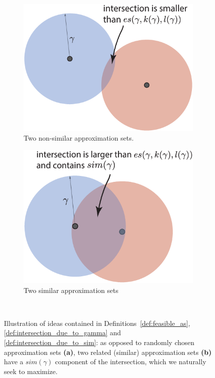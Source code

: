 \begin{figure}[t!]
  \centering
  \begin{subfigure}[b]{.49\textwidth}
      \label{fig:intersection_due_to_gamma} 
      \includegraphics[width=\linewidth]{figures/ch_generic_approach/intersection_due_to_gamma}
      \caption{Two non-similar approximation sets.}
  \end{subfigure}
  \hfill
  \begin{subfigure}[b]{.49\textwidth}
      \label{fig:intersection_due_to_sim}
      \includegraphics[width=\linewidth]{figures/ch_generic_approach/intersection_due_to_sim}
      \caption{Two similar approximation sets}
  \end{subfigure}
  \\[.5cm]
  \caption{Illustration of ideas contained in Definitions~\ref{def:feasible_as},
  \ref{def:intersection_due_to_gamma} and \ref{def:intersection_due_to_sim}: as
  opposed to randomly chosen approximation sets \textbf{(a)}, two related
  (similar) approximation sets \textbf{(b)} have a $sim(\gamma)$ component of
  the intersection, which we naturally seek to maximize.}
  \label{fig:intersection_types}
\end{figure}


